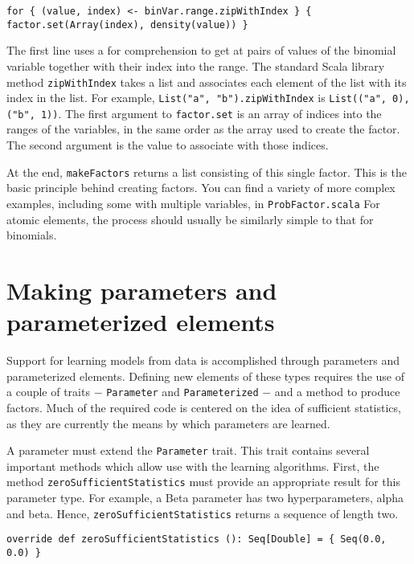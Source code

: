 \begin{flushleft}
\texttt{for \{ (value, index) <- binVar.range.zipWithIndex \} \{
\newline \tab factor.set(Array(index), density(value))
\newline \}
}
\end{flushleft}

The first line uses a for comprehension to get at pairs of values of the binomial variable together with their index into the range. The standard Scala library method \texttt{zipWithIndex} takes a list and associates each element of the list with its index in the list. For example, \texttt{List("a", "b").zipWithIndex} is \texttt{List(("a", 0), ("b", 1))}. The first argument to \texttt{factor.set} is an array of indices into the ranges of the variables, in the same order as the array used to create the factor. The second argument is the value to associate with those indices.

At the end, \texttt{makeFactors} returns a list consisting of this single factor. This is the basic principle behind creating factors. You can find a variety of more complex examples, including some with multiple variables, in  \texttt{ProbFactor.scala} For atomic elements, the process should usually be similarly simple to that for binomials.

\section{Making parameters and parameterized elements}

Support for learning models from data is accomplished through parameters and parameterized elements. Defining new elements of these types requires the use of a couple of traits $-$ \texttt{Parameter} and \texttt{Parameter\-ized} $-$ and a method to produce factors. Much of the required code is centered on the idea of sufficient statistics, as they are currently the means by which parameters are learned.

A parameter must extend the \texttt{Parameter} trait. This trait contains several important methods which allow use with the learning algorithms. First, the method \texttt{zeroSufficientStatistics} must provide an appropriate result for this parameter type. For example, a Beta parameter has two hyperparameters, alpha and beta. Hence, \texttt{zeroSuffic\-ientStatistics} returns a sequence of length two.

\begin{flushleft}
\texttt{override def zeroSufficientStatistics (): Seq[Double] = \{ 
\newline \tab Seq(0.0, 0.0)
\newline \}
}
\end{flushleft}

